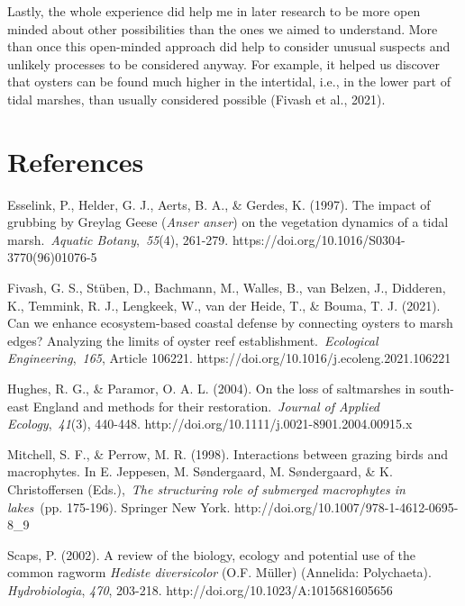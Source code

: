 \documentclass[authordate, empirical]{jote-new-article}
\begin{document}
	Lastly, the whole experience did help me in later research to be more open minded about other possibilities than the ones we aimed to understand. More than once this open-minded approach did help to consider unusual suspects and unlikely processes to be considered anyway. For example, it helped us discover that oysters can be found much higher in the intertidal, i.e., in the lower part of tidal marshes, than usually considered possible (Fivash et al., 2021).











	\section{References}



	Esselink, P., Helder, G. J., Aerts, B. A., \& Gerdes, K. (1997). The impact of grubbing by Greylag Geese (\emph{Anser anser}) on the vegetation dynamics of a tidal marsh. \emph{Aquatic Botany}, \emph{55}(4), 261-279. https://doi.org/10.1016/S0304-3770(96)01076-5



	Fivash, G. S., Stüben, D., Bachmann, M., Walles, B., van Belzen, J., Didderen, K., Temmink, R. J., Lengkeek, W., van der Heide, T., \& Bouma, T. J. (2021). Can we enhance ecosystem-based coastal defense by connecting oysters to marsh edges? Analyzing the limits of oyster reef establishment. \emph{Ecological Engineering}, \emph{165}, Article 106221. https://doi.org/10.1016/j.ecoleng.2021.106221



	Hughes, R. G., \& Paramor, O. A. L. (2004). On the loss of saltmarshes in south-east England and methods for their restoration. \emph{Journal of Applied Ecology}, \emph{41}(3), 440-448. http://doi.org/10.1111/j.0021-8901.2004.00915.x



	Mitchell, S. F., \& Perrow, M. R. (1998). Interactions between grazing birds and macrophytes. In E. Jeppesen, M. Søndergaard, M. Søndergaard, \& K. Christoffersen (Eds.), \emph{The structuring role of submerged macrophytes in lakes} (pp. 175-196). Springer New York. http://doi.org/10.1007/978-1-4612-0695-8\_9



	Scaps, P. (2002). A review of the biology, ecology and potential use of the common ragworm \emph{Hediste diversicolor }(O.F. Müller) (Annelida: Polychaeta). \emph{Hydrobiologia}, \emph{470}, 203-218. http://doi.org/10.1023/A:1015681605656
\end{document}
